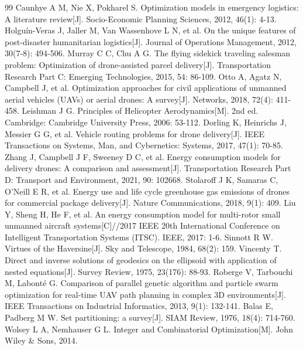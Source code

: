 \documentclass[12pt,a4paper,UTF8]{ctexart}
\begin{document}
\begin{thebibliography}{99}
 Caunhye A M, Nie X, Pokharel S. Optimization models in emergency logistics: A literature review[J]. Socio-Economic Planning Sciences, 2012, 46(1): 4-13.
 Holguín-Veras J, Jaller M, Van Wassenhove L N, et al. On the unique features of post-disaster humanitarian logistics[J]. Journal of Operations Management, 2012, 30(7-8): 494-506.
 Murray C C, Chu A G. The flying sidekick traveling salesman problem: Optimization of drone-assisted parcel delivery[J]. Transportation Research Part C: Emerging Technologies, 2015, 54: 86-109.
 Otto A, Agatz N, Campbell J, et al. Optimization approaches for civil applications of unmanned aerial vehicles (UAVs) or aerial drones: A survey[J]. Networks, 2018, 72(4): 411-458.
 Leishman J G. Principles of Helicopter Aerodynamics[M]. 2nd ed. Cambridge: Cambridge University Press, 2006: 53-112.
 Dorling K, Heinrichs J, Messier G G, et al. Vehicle routing problems for drone delivery[J]. IEEE Transactions on Systems, Man, and Cybernetics: Systems, 2017, 47(1): 70-85.
 Zhang J, Campbell J F, Sweeney D C, et al. Energy consumption models for delivery drones: A comparison and assessment[J]. Transportation Research Part D: Transport and Environment, 2021, 90: 102668.
 Stolaroff J K, Samaras C, O'Neill E R, et al. Energy use and life cycle greenhouse gas emissions of drones for commercial package delivery[J]. Nature Communications, 2018, 9(1): 409.
 Liu Y, Sheng H, He F, et al. An energy consumption model for multi-rotor small unmanned aircraft systems[C]//2017 IEEE 20th International Conference on Intelligent Transportation Systems (ITSC). IEEE, 2017: 1-6.
 Sinnott R W. Virtues of the Haversine[J]. Sky and Telescope, 1984, 68(2): 159.
 Vincenty T. Direct and inverse solutions of geodesics on the ellipsoid with application of nested equations[J]. Survey Review, 1975, 23(176): 88-93.
 Roberge V, Tarbouchi M, Labonté G. Comparison of parallel genetic algorithm and particle swarm optimization for real-time UAV path planning in complex 3D environments[J]. IEEE Transactions on Industrial Informatics, 2013, 9(1): 132-141.
 Balas E, Padberg M W. Set partitioning: a survey[J]. SIAM Review, 1976, 18(4): 714-760.
 Wolsey L A, Nemhauser G L. Integer and Combinatorial Optimization[M]. John Wiley \& Sons, 2014.

\end{thebibliography}
\end{document}
